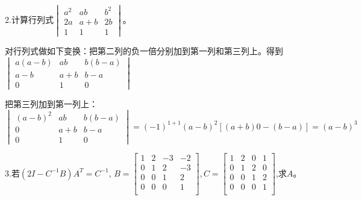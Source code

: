 \documentclass{article}
\begin{document}
2.计算行列式$
\begin{vmatrix}
  a^{2} & ab & b^{2}\\
  2a & a+b & 2b \\
  1 & 1 & 1
\end{vmatrix}
$。

\begin{jie}
对行列式做如下变换：把第二列的负一倍分别加到第一列和第三列上。得到$
\begin{vmatrix}
  a(a-b) & ab & b(b-a)\\
  a-b & a+b & b-a \\
  0 & 1 & 0
\end{vmatrix}
$

把第三列加到第一列上：
\begin{equation*}
\begin{vmatrix}
  (a-b)^{2} & ab & b(b-a)\\
  0 & a+b & b-a \\
  0 & 1 & 0
\end{vmatrix}=(-1)^{1+1}(a-b)^{2}[(a+b)0-(b-a)]=(a-b)^{3}
\end{equation*}
\end{jie}

3.若$(2I-C^{-1}B)A^{T}=C^{-1}$,
$B=
\begin{bmatrix}
  1 & 2 & -3 & -2\\
  0 & 1 & 2 & -3\\
  0 & 0 & 1 & 2\\
  0 & 0 & 0 & 1\\
\end{bmatrix},C=
\begin{bmatrix}
  1 & 2 & 0 & 1\\
  0 & 1 & 2 & 0\\
  0 & 0 & 1 & 2\\
  0 & 0 & 0 & 1\\
\end{bmatrix}
$,求$A$。
\end{document}
